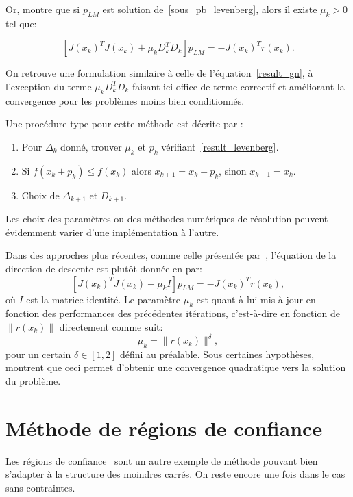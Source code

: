 Or, \citet{jjmore78} montre que si $p_{LM}$ est solution de~\eqref{sous_pb_levenberg}, alors il existe $\mu_k > 0$ tel que:

\begin{equation}\label{result_levenberg}
\left[J(x_k)^TJ(x_k)+\mu_kD_k^TD_k\right]p_{LM}=-J(x_k)^Tr(x_k).
\end{equation}

On retrouve une formulation similaire à celle de l'équation~\eqref{result_gn}, à l'exception du terme $\mu_kD_k^TD_k$ faisant ici office de terme correctif et 
améliorant la convergence pour les problèmes moins bien conditionnés.

Une procédure type pour cette méthode est décrite par \citet{jjmore78}:
\begin{enumerate}
    \item Pour $\Delta_k$ donné, trouver $\mu_k$ et $p_k$ vérifiant~\eqref{result_levenberg}.
    \item Si $f(x_k+p_k) \leq f(x_k)$ alors $x_{k+1}=x_k+p_k$, sinon $x_{k+1}=x_k$.
    \item Choix de $\Delta_{k+1}$ et $D_{k+1}$.
\end{enumerate}

Les choix des paramètres ou des méthodes numériques de résolution peuvent évidemment varier d'une implémentation à l'autre.

Dans des approches plus récentes, comme celle présentée par~\citet{yuan11},
l'équation de la direction de descente est plutôt donnée en par:
\begin{equation}\label{result_levenberg_2}
    \left[J(x_k)^TJ(x_k)+\mu_kI\right]p_{LM}=-J(x_k)^Tr(x_k),
\end{equation}
 où $I$ est la matrice identité. Le paramètre $\mu_k$ est quant à lui mis à jour en fonction des performances des précédentes itérations, 
 c'est-à-dire en fonction de $\|r(x_k)\|$ directement comme suit:
 \[
 \mu_k = \|r(x_k)\|^{\delta},
 \]
pour un certain $\delta \in [1,2]$ défini au préalable. Sous certaines hypothèses, \citet{yamafuku01} montrent que ceci permet d'obtenir une convergence 
quadratique vers la solution du problème.

\section{Méthode de régions de confiance}\label{method_trust_region}


Les régions de confiance~\cite{conngoultoin00} sont un autre exemple de méthode pouvant bien s'adapter à la structure des moindres carrés. On reste encore une fois dans le cas sans 
contraintes.

